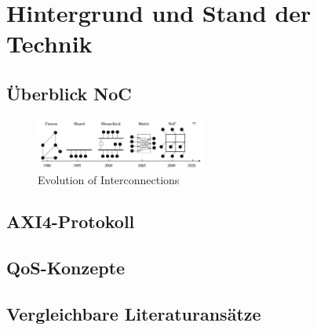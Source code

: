\chapter{Hintergrund und Stand der Technik}

\section{Überblick NoC}
\begin{figure}[htbp]
  \centering
  \includegraphics[width=0.5\textwidth]{img/Evolution of On-Chip communication interconnect.png}
  \caption{Evolution of Interconnections~\cite{BenAbdallah2013}}
  \label{fig:Evolution_of_Interconnection}
\end{figure}

\section{AXI4-Protokoll}

\section{QoS-Konzepte}

\section{Vergleichbare Literaturansätze}
